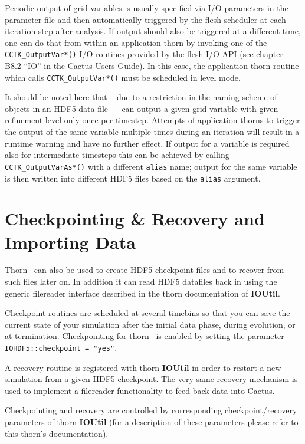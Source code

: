 \documentclass{article}
\begin{document}
Periodic output of grid variables is usually specified via I/O parameters
in the parameter file and then automatically triggered by the flesh scheduler
at each iteration step after analysis. If output should also be triggered
at a different time, one can do that from within an application thorn by
invoking one of the {\tt CCTK\_OutputVar*()} I/O routines provided
by the flesh I/O API (see chapter B8.2 ``IO'' in the Cactus Users Guide).
In this case, the application thorn routine which calls {\tt CCTK\_OutputVar*()}
must be scheduled in level mode.

It should be noted here that -- due to a restriction in the naming scheme of
objects in an HDF5 data file -- \ThisThorn\ can output a given grid variable
with given refinement level only once per timestep. Attempts of application
thorns to trigger the output of the same variable multiple times during an iteration
will result in a runtime warning and have no further effect.
If output for a variable is required also for intermediate timesteps
this can be achieved by calling {\tt CCTK\_OutputVarAs*()} with a different
{\tt alias} name; output for the same variable is then written into
different HDF5 files based on the {\tt alias} argument.


\section{Checkpointing \& Recovery and Importing Data}

Thorn \ThisThorn\ can also be used to create HDF5 checkpoint files and
to recover from such files later on. In addition it can read HDF5 datafiles
back in using the generic filereader interface described in the thorn
documentation of {\bf IOUtil}.

Checkpoint routines are scheduled at several timebins so that you can save
the current state of your simulation after the initial data phase,
during evolution, or at termination. Checkpointing for thorn \ThisThorn\ 
is enabled by setting the parameter {\tt IOHDF5::checkpoint = "yes"}.

A recovery routine is registered with thorn {\bf IOUtil} in order to restart
a new simulation from a given HDF5 checkpoint.
The very same recovery mechanism is used to implement a filereader
functionality to feed back data into Cactus.

Checkpointing and recovery are controlled by corresponding checkpoint/recovery
parameters of thorn {\bf IOUtil} (for a description of these parameters please
refer to this thorn's documentation).
\end{document}

